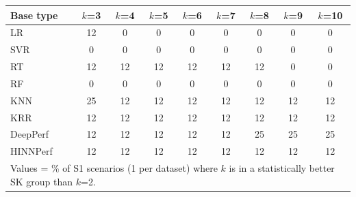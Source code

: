 \begin{tabular}{lcccccccc}
\toprule
Base type & $k$=3 & $k$=4 & $k$=5 & $k$=6 & $k$=7 & $k$=8 & $k$=9 & $k$=10 \\
\midrule
LR & 12 & 0 & 0 & 0 & 0 & 0 & 0 & 0 \\
SVR & 0 & 0 & 0 & 0 & 0 & 0 & 0 & 0 \\
RT & 12 & 12 & 12 & 12 & 12 & 12 & 0 & 0 \\
RF & 0 & 0 & 0 & 0 & 0 & 0 & 0 & 0 \\
KNN & 25 & 12 & 12 & 12 & 12 & 12 & 12 & 12 \\
KRR & 12 & 12 & 12 & 12 & 12 & 12 & 12 & 12 \\
DeepPerf & 12 & 12 & 12 & 12 & 12 & 25 & 25 & 25 \\
HINNPerf & 12 & 12 & 12 & 12 & 12 & 12 & 12 & 12 \\
\bottomrule
\multicolumn{9}{l}{\footnotesize Values = \% of S1 scenarios (1 per dataset) where $k$ is in a statistically better SK group than $k$=2.}} \\
\end{tabular}
